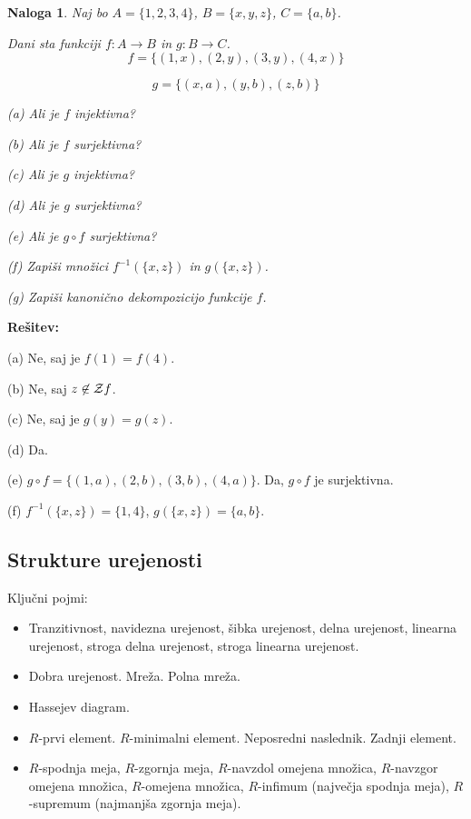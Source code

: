 \documentclass[11pt,paper=b5,footinclude,headinclude]{scrbook} %
\newtheorem*{problem}{Naloga}
\begin{document}
\begin{problem}
Naj bo $A = \{1,2,3,4\}$, $B = \{x,y,z\}$, $C = \{a,b\}$.

Dani sta funkciji $f:A\to B$ in $g:B\to C$.
$$f = \{(1,x),(2,y),(3,y),(4,x)\}$$

$$g = \{(x,a),(y,b),(z,b)\}$$

(a) Ali je $f$ injektivna?

(b) Ali je $f$ surjektivna?

(c) Ali je $g$ injektivna?

(d) Ali je $g$ surjektivna?

(e) Ali je $g\circ f$ surjektivna?

(f) Zapiši množici $f^{-1}(\{x,z\})$ in $g(\{x,z\})$.

(g) Zapiši kanonično dekompozicijo funkcije $f$.
\end{problem}

\textbf{Rešitev:}

(a) Ne, saj je $f(1) = f(4)$.

(b) Ne, saj $z\not\in{\cal Z} f$.

(c) Ne, saj je $g(y) = g(z)$.

(d) Da.

(e) $g\circ f = \{(1,a), (2,b), (3,b), (4,a)\}$. Da, $g\circ f$ je surjektivna.

(f) $f^{-1}(\{x,z\}) = \{1,4\}$, $g(\{x,z\}) = \{a,b\}$.
%
%
%
%

\subsection{Strukture urejenosti}
Ključni pojmi:
\begin{itemize}
\item Tranzitivnost, navidezna urejenost, šibka urejenost, delna urejenost,
linearna urejenost, stroga delna urejenost, stroga linearna urejenost.
\item Dobra urejenost. Mreža. Polna mreža.
\item Hassejev diagram.
\item $R$-prvi element. $R$-minimalni element. Neposredni naslednik. Zadnji element.
\item $R$-spodnja meja, $R$-zgornja meja, $R$-navzdol omejena množica, $R$-navzgor omejena
množica, $R$-omejena množica, $R$-infimum (največja spodnja meja),
$R$-supremum (najmanjša zgornja meja).
\end{itemize}
\end{document}
